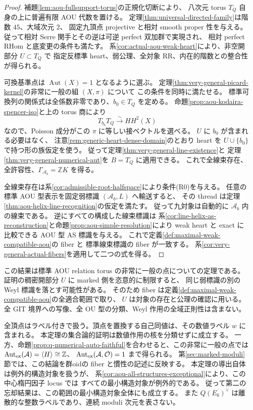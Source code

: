 \begin{proof}
補題\ref{lem:aou-fullsupport-torus}の正規化切断により、
八次元 torus $T_Q$ 自身の上に普遍有限 AOU 代数を置ける。
定理\ref{thm:universal-directed-family}は階数 $45$、大域次元 $2$、
固定九頂点 projective と相対 smooth proper 性を与える。
従って相対 Serre 関手とその逆は可逆 perfect 双加群で実現され、
相対 perfect RHom と底変更の条件も満たす。
系\ref{cor:actual-aou-weak-heart}により、非空開部分 $U\subset T_Q$ で
指定反標準 heart、弱公理、全対象 RR、内在的階数との整合性が得られる。

可換基準点は $\operatorname{Aut}(X)=1$ となるように選ぶ。
定理\ref{thm:very-general-picard-kernel}の非常に一般の組 $(X,\pi)$ について
この条件を同時に満たせる。
標準可換列の関係式は全係数非零であり、$b_0\in T_Q$ を定める。
命題\ref{prop:aou-kodaira-spencer-iso}と上の torus 商により
\[
 T_{b_0}T_Q\xrightarrow{\sim}HH^2(X)
\]
なので、Poisson 成分がこの $\pi$ に等しい接ベクトルを選べる。
$U$ に $b_0$ が含まれる必要はなく、
注意\ref{rem:generic-heart-dense-domain}のとおり
heart を $U\cup\{b_0\}$ で持つ形の族仮定を使う。
従って定理\ref{thm:very-general-line-existence}と
定理\ref{thm:very-general-numerical-aut}を $B=T_Q$ に適用できる。
これで全線束存在、全許容性、$\Gamma_{\mathcal A_b}=\mathbb ZK$ を得る。

全線束存在は系\ref{cor:admissible-root-halfspace}により条件(R0)を与える。
任意の標準 AOU 型表示を固定弱標識 $(\mathcal A_b,L)$ へ輸送すると、
その thread は定理\ref{thm:aou-helix-line-recognition}の仮定を満たす。
従って九対象は自動的に $\mathcal A_b$ 内の線束である。
逆にすべての構成した線束標識は
系\ref{cor:line-helix-as-reconstruction}と命題\ref{prop:aou-simple-resolution}により
weak heart と exact に比較できる AOU 型 AS 標識を与える。
これで定義\ref{def:maximal-weak-compatible-aou}の fiber と
標準線束標識の fiber が一致する。
系\ref{cor:very-general-actual-fibers}を適用して二つの式を得る。
\end{proof}

\begin{remark}[範囲と自然なラベル]\label{rem:generic-aut-aou-input}
この結果は標準 AOU relation torus の非常に一般の点についての定理である。
証明の稠密開部分 $U$ に marked 側を恣意的に制限すると、
同じ弱標識の別の Weyl 標識を落とす可能性がある。
そのため fiber は定義\ref{def:maximal-weak-compatible-aou}の全適合範囲で取り、
$U$ は対象の存在と公理の確認に用いる。
全 GIT 境界への写像、全 OU 型の分類、Weyl 作用の全域正則性は含まない。

全頂点はラベル付きで扱う。頂点を置換する自己同値は、その数値ラベル $w$ に含まれる。
本定理の集合論的証明は数値作用の核を分類せずに成立する。
一方、命題\ref{prop:q-numerical-auto-faithful}を合わせると、この非常に一般の点では
$\operatorname{Aut}_{\rm ex}(\mathcal A)=\langle H\rangle\cong\mathbb Z$、
$\operatorname{Aut}_{\rm ex}(\mathcal A,\mathcal O)=1$ まで得られる。
第\ref{sec:marked-moduli}節では、この結論を群oidの fiber と慣性の記述に反映する。
本定理の導出自体は例外的構造対象を扱うが、
系\ref{cor:aou-all-structures-exceptional}により、この中心楕円因子 locus では
すべての最小構造対象が例外的である。
従って第二の忘却結果は、この範囲の最小構造対象全体にも成立する。
また $Q(E_6)^\vee$ は離散的な整数ラベルであり、連続 moduli 次元を表さない。
\end{remark}
